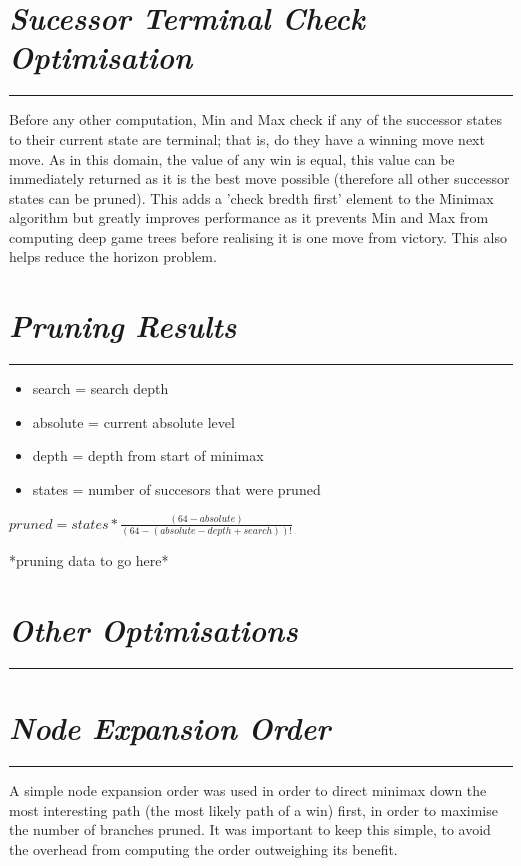 \documentclass[10pt]{report}
\begin{document}
\begin{multicols}{2}
\section*{\emph{\textmd{Sucessor Terminal Check Optimisation}}}
\hrule
\vspace{0.4cm}

Before any other computation, Min and Max check if any of the successor states to their current state are terminal; that is, do they have a winning move next move. As in this domain, the value of any win is equal, this value can be immediately returned as it is the best move possible (therefore all other successor states can be pruned). This adds a 'check bredth first' element to the Minimax algorithm but greatly improves performance as it prevents Min and Max from computing deep game trees before realising it is one move from victory. This also helps reduce the horizon problem.

\section*{\emph{\textmd{Pruning Results}}}
\hrule
\vspace{0.4cm}

\begin{itemize}
\item search = search depth
\item absolute = current absolute level
\item depth = depth from start of minimax
\item states = number of succesors that were pruned
\end{itemize}

$pruned = states * \frac{(64 - absolute)}{(64 - (absolute - depth + search))!}$

*pruning data to go here*

\section*{\emph{{Other Optimisations}}}
\hrule
\vspace{0.4cm}

\section*{\emph{\textmd{Node Expansion Order}}}
\hrule
\vspace{0.4cm}

A simple node expansion order was used in order to direct minimax down the most interesting path (the most likely path of a win) first, in order to maximise the number of branches pruned. It was important to keep this simple, to avoid the overhead from computing the order outweighing its benefit.


\end{multicols}
\end{document}
